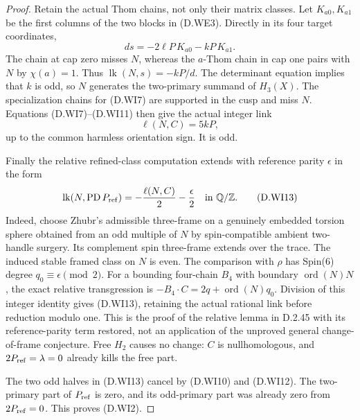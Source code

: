 \begin{proof}
Retain the actual Thom chains, not only their matrix classes.
Let $K_{a0},K_{a1}$ be the first columns of the two blocks in
(D.WE3).  Directly in its four target coordinates,
\[
                    d s=-2\ell P\,K_{a0}-kP\,K_{a1}.
 \tag{D.WI11}
\]
The chain at cap zero misses $N$, whereas the $a$-Thom
chain in cap one pairs with $N$ by $\chi(a)=1$.
Thus $\operatorname{lk}(N,s)=-kP/d$.
The determinant equation implies that $k$ is odd, so $N$
generates the two-primary summand of $H_3(X)$.
The specialization chains for (D.WI7) are supported in the
cusp and miss $N$.  Equations (D.WI7)--(D.WI11) then give
the actual integer link
\[
                          \ell(N,C)=5kP,
 \tag{D.WI12}
\]
up to the common harmless orientation sign.  It is odd.

Finally the relative refined-class computation extends with
reference parity $\epsilon$ in the form
\[
 \operatorname{lk}(N,\operatorname{PD}P_{\rm ref})
                 =-\frac{\ell(N,C)}2-\frac{\epsilon}2
                                      \quad\text{in }\mathbb Q/\mathbb Z .
 \tag{D.WI13}
\]
Indeed, choose Zhubr's admissible three-frame on a genuinely
embedded torsion sphere obtained from an odd multiple of $N$
by spin-compatible ambient two-handle surgery.  Its complement
spin three-frame extends over the trace.  The induced stable
framed class on $N$ is even.  The comparison with $\rho$ has
Spin(6) degree $q_0\equiv\epsilon\pmod2$.
For a bounding four-chain $B_4$ with boundary
$\operatorname{ord}(N)N$, the exact relative transgression is
$-B_4\cdot C=2q+\operatorname{ord}(N)q_0$.
Division of this integer identity gives (D.WI13), retaining
the actual rational link before reduction modulo one.
This is the proof of the relative lemma in D.2.45 with its
reference-parity term restored, not an application of the
unproved general change-of-frame conjecture.
Free $H_2$ causes no change: $C$ is nullhomologous, and
$2P_{\rm ref}=\lambda=0$ already kills the free part.

The two odd halves in (D.WI13) cancel by (D.WI10) and
(D.WI12).  The two-primary part of $P_{\rm ref}$ is zero,
and its odd-primary part was already zero from
$2P_{\rm ref}=0$.  This proves (D.WI2).
\end{proof}


